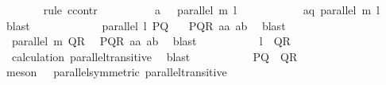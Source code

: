 \begin{isabellebody}
\ \ \ \ \ \ \isamarkupfalse%
\ {\isacharparenleft}{\kern0pt}rule\ ccontr{\isacharparenright}{\kern0pt}\isanewline
\ \ \ \ \ \ \ \ \isamarkupfalse%
\ a{\isacharcolon}{\kern0pt}\ {\isachardoublequoteopen}{\isasymnot}\ {\isasymnot}\ parallel\ {\isacharquery}{\kern0pt}m\ {\isacharquery}{\kern0pt}l{\isachardoublequoteclose}\isanewline
\ \ \ \ \ \ \ \ \isamarkupfalse%
\ \isamarkupfalse%
\ aq{\isacharcolon}{\kern0pt}\ {\isachardoublequoteopen}parallel\ {\isacharquery}{\kern0pt}m\ {\isacharquery}{\kern0pt}l{\isachardoublequoteclose}\ \isamarkupfalse%
\ blast\isanewline
\ \ \ \ \ \ \ \ \isamarkupfalse%
\ \isamarkupfalse%
\ {}{\isacharcolon}{\kern0pt}\ {\isachardoublequoteopen}parallel\ {\isacharquery}{\kern0pt}l\ {\isacharquery}{\kern0pt}PQ{\isachardoublequoteclose}\ \ \isamarkupfalse%
\ PQR\ a{}a\ a{}b\ \isamarkupfalse%
\ blast\isanewline
\ \ \ \ \ \ \ \ \isamarkupfalse%
\ {}{\isacharcolon}{\kern0pt}\ {\isachardoublequoteopen}parallel\ {\isacharquery}{\kern0pt}m\ {\isacharquery}{\kern0pt}QR{\isachardoublequoteclose}\ \isamarkupfalse%
\ PQR\ a{}a\ a{}b\ \isamarkupfalse%
\ blast\isanewline
\ \ \ \ \ \ \ \ \isamarkupfalse%
\ {}{\isacharcolon}{\kern0pt}\ {\isachardoublequoteopen}{\isacharquery}{\kern0pt}l\ {\isacharbar}{\kern0pt}{\isacharbar}{\kern0pt}\ {\isacharquery}{\kern0pt}QR{\isachardoublequoteclose}\ \isanewline
\ \ \ \ \ \ \ \ \ \ \isamarkupfalse%
\ {\isachardoublequoteopen}{}{\isachardoublequoteclose}\ calculation\ parallel{\isacharunderscore}{\kern0pt}transitive\ \isamarkupfalse%
\ blast\isanewline
\ \ \ \ \ \ \ \ \isamarkupfalse%
\ {}{\isacharcolon}{\kern0pt}\ {\isachardoublequoteopen}{\isacharquery}{\kern0pt}PQ\ {\isacharbar}{\kern0pt}{\isacharbar}{\kern0pt}\ {\isacharquery}{\kern0pt}QR{\isachardoublequoteclose}\isanewline
\ \ \ \ \ \ \ \ \ \ \isamarkupfalse%
\ {\isacharparenleft}{\kern0pt}meson\ {\isachardoublequoteopen}{}{\isachardoublequoteclose}\ {\isachardoublequoteopen}{}{\isachardoublequoteclose}\ parallel{\isacharunderscore}{\kern0pt}symmetric\ parallel{\isacharunderscore}{\kern0pt}transitive{}{\isacharparenright}{\kern0pt}\isanewline
\ \ \ \ \ \ \ \ \isamarkupfalse%

\end{isabellebody}
